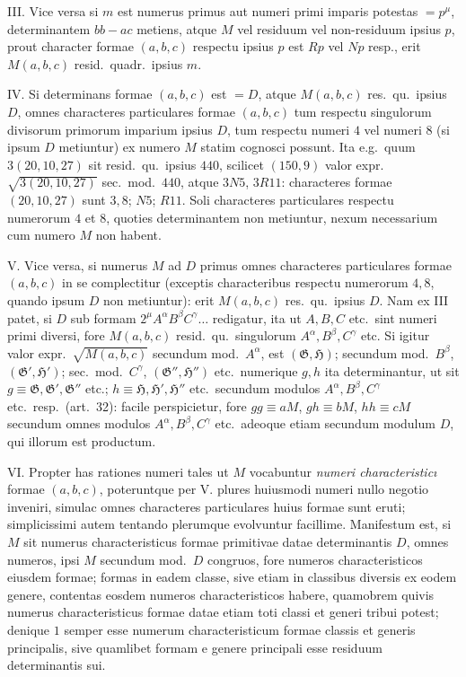 \documentclass[12pt,a4paper]{article}
\theoremstyle{plain}
\theoremstyle{definition}
\theoremstyle{remark}
\begin{document}
\textsc{III.} Vice versa si $m$ est numerus primus aut numeri primi imparis potestas $=p^\mu$, determinantem $bb-ac$ metiens, atque $M$ vel residuum vel non-residuum ipsius $p$, prout character formae $(a,b,c)$ respectu ipsius $p$ est $Rp$ vel $Np$ resp., erit $M(a,b,c)$ resid.\ quadr.\ ipsius $m$.

\textsc{IV.} Si determinans formae $(a,b,c)$ est $=D$, atque $M(a,b,c)$ res.\ qu.\ ipsius $D$, omnes characteres particulares formae $(a,b,c)$ tum respectu singulorum divisorum primorum imparium ipsius $D$, tum respectu numeri $4$ vel numeri $8$ (si ipsum $D$ metiuntur) ex numero $M$ statim cognosci possunt. Ita e.g.\ quum $3(20,10,27)$ sit resid.\ qu.\ ipsius $440$, scilicet $(150,9)$ valor expr.\ $\sqrt{3(20,10,27)}$ sec.\ mod.\ $440$, atque $3N5$, $3R11$: characteres formae $(20,10,27)$ sunt $3,8$; $N5$; $R11$. Soli characteres particulares respectu numerorum $4$ et $8$, quoties determinantem non metiuntur, nexum necessarium cum numero $M$ non habent.

\textsc{V.} Vice versa, si numerus $M$ ad $D$ primus omnes characteres particulares formae $(a,b,c)$ in se complectitur (exceptis characteribus respectu numerorum $4,8$, quando ipsum $D$ non metiuntur): erit $M(a,b,c)$ res.\ qu.\ ipsius $D$. Nam ex III patet, si $D$ sub formam $2^\mu A^\alpha B^\beta C^\gamma\ldots$ redigatur, ita ut $A,B,C$ etc.\ sint numeri primi diversi, fore $M(a,b,c)$ resid.\ qu.\ singulorum $A^\alpha,B^\beta,C^\gamma$ etc. Si igitur valor expr.\ $\sqrt{M(a,b,c)}$ secundum mod.\ $A^\alpha$, est $(\mathfrak{G},\mathfrak{H})$; secundum mod.\ $B^\beta$, $(\mathfrak{G}',\mathfrak{H}')$; sec.\ mod.\ $C^\gamma$, $(\mathfrak{G}'',\mathfrak{H}'')$ etc.\ numerique $g,h$ ita determinantur, ut sit $g\equiv\mathfrak{G},\mathfrak{G}',\mathfrak{G}''$ etc.; $h\equiv\mathfrak{H},\mathfrak{H}',\mathfrak{H}''$ etc.\ secundum modulos $A^\alpha,B^\beta,C^\gamma$ etc.\ resp.\ (art.~32): facile perspicietur, fore $gg\equiv aM$, $gh\equiv bM$, $hh\equiv cM$ secundum omnes modulos $A^\alpha,B^\beta,C^\gamma$ etc.\ adeoque etiam secundum modulum $D$, qui illorum est productum.

\textsc{VI.} Propter has rationes numeri tales ut $M$ vocabuntur \emph{numeri characteristic\i} formae $(a,b,c)$, poteruntque per V. plures huiusmodi numeri nullo negotio inveniri, simulac omnes characteres particulares huius formae sunt eruti; simplicissimi autem tentando plerumque evolvuntur facillime. Manifestum est, si $M$ sit numerus characteristicus formae primitivae datae determinantis $D$, omnes numeros, ipsi $M$ secundum mod.\ $D$ congruos, fore numeros characteristicos eiusdem formae; formas in eadem classe, sive etiam in classibus diversis ex eodem genere, contentas eosdem numeros characteristicos habere, quamobrem quivis numerus characteristicus formae datae etiam toti classi et generi tribui potest; denique $1$ semper esse numerum characteristicum formae classis et generis principalis, sive quamlibet formam e genere principali esse residuum determinantis sui.
\end{document}
